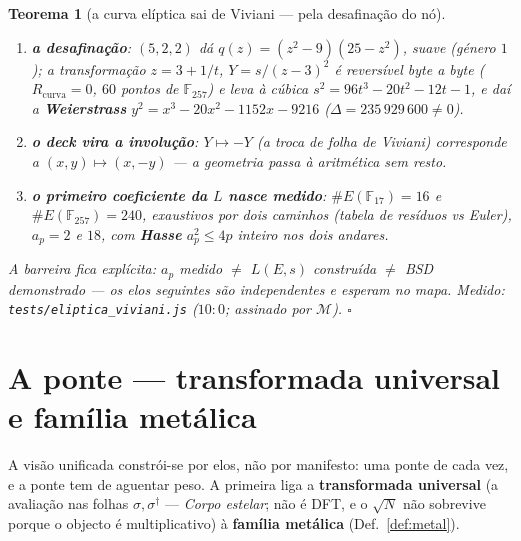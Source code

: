 \documentclass[11pt,a4paper]{article}
\newtheorem{teorema}{Teorema}
\newcommand{\code}[1]{\texttt{#1}}
\begin{document}
\begin{teorema}[a curva elíptica sai de Viviani --- pela desafinação
do nó]
\begin{enumerate}
nodal \emph{falha} o teste elíptico (raiz dupla, $\Delta=0$) --- o
gume, exatamente como deve ser.
\item \textbf{a desafinação}: $(5,2,2)$ dá
$q(z)=(z^{2}{-}9)(25{-}z^{2})$, suave (género $1$); a transformação
$z=3+1/t$, $Y=s/(z{-}3)^{2}$ é \emph{reversível byte a byte}
($R_{\text{curva}}=0$, $60$ pontos de $\mathbb{F}_{257}$) e leva à
cúbica $s^{2}=96t^{3}{-}20t^{2}{-}12t{-}1$, e daí a
\textbf{Weierstrass} $y^{2}=x^{3}{-}20x^{2}{-}1152x{-}9216$
($\Delta=235\,929\,600\neq0$).
\item \textbf{o deck vira a involução}: $Y\mapsto-Y$ (a troca de
folha de Viviani) corresponde a $(x,y)\mapsto(x,-y)$ --- a geometria
passa à aritmética sem resto.
\item \textbf{o primeiro coeficiente da $L$ nasce medido}:
$\#E(\mathbb{F}_{17})=16$ e $\#E(\mathbb{F}_{257})=240$, exaustivos
por dois caminhos (tabela de resíduos vs Euler), $a_{p}=2$ e $18$,
com \textbf{Hasse} $a_{p}^{2}\le4p$ inteiro nos dois andares.
\end{enumerate}
A barreira fica explícita: $a_{p}$ \emph{medido} $\neq$ $L(E,s)$
\emph{construída} $\neq$ BSD \emph{demonstrado} --- os elos seguintes
são independentes e esperam no mapa.
\emph{Medido:} \code{tests/eliptica\_viviani.js} ($10{:}0$; assinado
por $\mathcal{M}$).
$\square$
\end{teorema}

\section{A ponte --- transformada universal e família metálica}\label{sec:ponte}

A visão unificada constrói-se por elos, não por manifesto: uma ponte de
cada vez, e a ponte tem de aguentar peso. A primeira liga a
\textbf{transformada universal} (a avaliação nas folhas $\sigma,\sigma^{\dagger}$
--- \emph{Corpo estelar}; não é DFT, e o $\sqrt N$ não sobrevive porque o
objecto é multiplicativo) à \textbf{família metálica}
(Def.~\ref{def:metal}).
\end{document}

